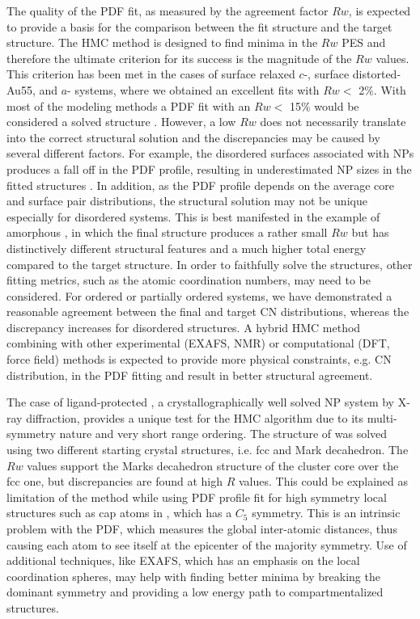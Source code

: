 The quality of the PDF fit, as measured by the agreement factor $Rw$, is expected to provide a basis for the comparison between the fit structure and the target structure. The HMC method is designed to find minima in the $Rw$ PES and therefore the ultimate criterion for its success is the magnitude of the $Rw$ values. This criterion has been met in the cases of surface relaxed $c$-, surface distorted-Au55, and $a$- systems, where we obtained an excellent fits with  $Rw<$ 2\%.
With most of the modeling methods a PDF fit with an $Rw<$ 15\% would be considered a solved structure \cite{Petkov2014, Emil, Masadeh2007, Shi2014, Petkov2012}.
However, a low $Rw$ does not necessarily translate into the correct structural solution and the discrepancies may be caused by several different factors.
For example, the disordered surfaces associated with NPs produces a fall off in the PDF profile, resulting in underestimated NP sizes in the fitted structures \cite{Petkov2014}.
In addition, as the PDF profile depends on the average core and surface pair distributions, the structural solution may not be unique especially for disordered systems. This is best manifested in the example of amorphous , in which the final structure produces a rather small $Rw$ but has distinctively different structural features and a much higher total energy compared to the target structure. In order to faithfully solve the structures, other fitting metrics, such as the atomic coordination numbers, may need to be considered.  For  ordered or partially ordered systems, we have demonstrated  a reasonable agreement between the final and target CN distributions, whereas the discrepancy increases for disordered structures.  A hybrid HMC method combining with other experimental  (EXAFS, NMR) or computational (DFT, force field)  methods is expected to provide more physical constraints, e.g. CN distribution,  in the PDF fitting and result in better structural agreement.

The case of ligand-protected ,  a crystallographically well solved NP system by X-ray diffraction, provides a unique test for the HMC algorithm due to its multi-symmetry nature and very short range ordering.  The structure of   was solved using two different starting crystal structures, i.e. fcc and Mark decahedron. The  $Rw$ values support the Marks decahedron structure of the cluster core over the fcc one, but discrepancies are found at high $R$ values.  This could be explained as limitation of the method while using PDF profile fit for high symmetry local structures such as cap atoms in , which has a $C_{5}$ symmetry.  This is an intrinsic problem with the PDF, which measures the global inter-atomic distances, thus causing each atom to see itself at the epicenter of the majority symmetry.
Use of additional techniques, like EXAFS, which has an emphasis on the local coordination spheres, may help with finding better minima by breaking the dominant symmetry and providing a low energy path to compartmentalized structures.

